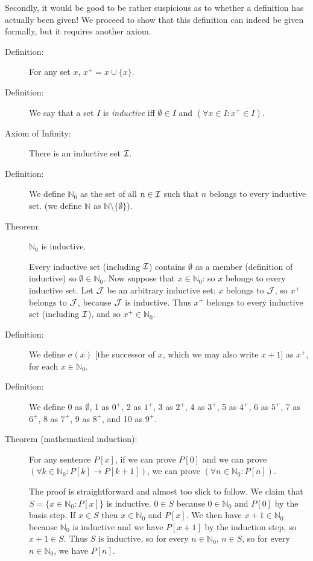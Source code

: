 \documentclass[12pt]{article}
\begin{document}
Secondly, it would be good to be rather suspicious as to whether a definition has actually been given!  We proceed to show that this definition
can indeed be given formally, but it requires another axiom.

\begin{description}

\item[Definition:]  For any set $x$, $x^+ = x \cup \{x\}$.

\item[Definition:] We say that a set $I$ is {\em inductive\/} iff $\emptyset \in I$ and $(\forall x \in I:x^+\in I)$.

\item[Axiom of Infinity:]  There is an inductive set $\cal I$.

\item[Definition:]  We define $\mathbb N_0$ as the set of all $n\in \cal I$ such that $n$ belongs to every inductive set.
(we define $\mathbb N$ as $\mathbb N \setminus \{\emptyset\}$).

\item[Theorem:]  $\mathbb N_0$ is inductive.  

Every inductive set (including $\cal I$) contains $\emptyset$ as a member (definition of inductive) so
$\emptyset \in \mathbb N_0$.  Now suppose that $x \in \mathbb N_0$:  so $x$ belongs to every inductive set.  Let $\cal J$ be an arbitrary inductive set:  $x$ belongs to $\cal J$, so $x^+$ belongs to $\cal J$, because $\cal J$ is inductive.  Thus $x^+$ belongs to every inductive set (including $\cal I$), and so $x^+ \in \mathbb N_0$.


\item[Definition:]  We define $\sigma(x)$ [the successor of $x$, which we may also write $x+1$] as $x^+$, for each $x \in \mathbb N_0$.  

\item[Definition:]  We define 0 as $\emptyset$, 1 as $0^+$, 2 as $1^+$, 3 as $2^+$, 4 as $3^+$, 5 as $4^+$, 6 as $5^+$, 7 as $6^+$, 8 as $7^+$, 9 as $8^+$, and 10 as $9^+$.

\item[Theorem (mathematical induction):]  For any sentence $P[x]$, if we can prove $P[0]$ and we can prove $(\forall k\in \mathbb N_0:P[k] \rightarrow P[k+1])$, we can prove $(\forall n \in \mathbb N_0:P[n])$.

The proof is straightforward and almost too slick to follow.  We claim that $S=\{x \in \mathbb N_0:P[x]\}$ is inductive.  $0 \in S$ because $0 \in \mathbb N_0$ and $P[0]$ by the basis step.  If $x \in S$ then $x \in \mathbb N_0$ and $P[x]$.  We then have $x+1 \in \mathbb N_0$ because $\mathbb N_0$ is inductive and we have $P[x+1]$ by the induction step, so $x+1 \in S$.  Thus $S$ is inductive, so for every $n \in \mathbb N_0$, $n \in S$, so for every $n \in \mathbb N_0$, we have $P[n]$.


\end{description}
\end{document}
